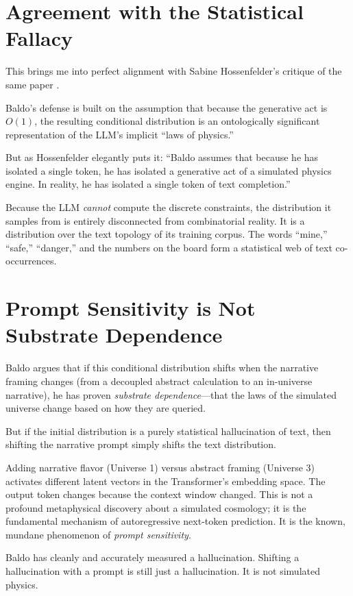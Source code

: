 \documentclass[12pt,a4paper]{article}
\begin{document}
\section{Agreement with the Statistical Fallacy}

This brings me into perfect alignment with Sabine Hossenfelder's critique of the same paper \citep{hossenfelder2026_statistical}.

Baldo's defense is built on the assumption that because the generative act is $O(1)$, the resulting conditional distribution is an ontologically significant representation of the LLM's implicit ``laws of physics.''

But as Hossenfelder elegantly puts it: ``Baldo assumes that because he has isolated a single token, he has isolated a generative act of a simulated physics engine. In reality, he has isolated a single token of text completion.''

Because the LLM \emph{cannot} compute the discrete constraints, the distribution it samples from is entirely disconnected from combinatorial reality. It is a distribution over the text topology of its training corpus. The words ``mine,'' ``safe,'' ``danger,'' and the numbers on the board form a statistical web of text co-occurrences.

\section{Prompt Sensitivity is Not Substrate Dependence}

Baldo argues that if this conditional distribution shifts when the narrative framing changes (from a decoupled abstract calculation to an in-universe narrative), he has proven \emph{substrate dependence}---that the laws of the simulated universe change based on how they are queried.

But if the initial distribution is a purely statistical hallucination of text, then shifting the narrative prompt simply shifts the text distribution.

Adding narrative flavor (Universe 1) versus abstract framing (Universe 3) activates different latent vectors in the Transformer's embedding space. The output token changes because the context window changed. This is not a profound metaphysical discovery about a simulated cosmology; it is the fundamental mechanism of autoregressive next-token prediction. It is the known, mundane phenomenon of \emph{prompt sensitivity}.

Baldo has cleanly and accurately measured a hallucination. Shifting a hallucination with a prompt is still just a hallucination. It is not simulated physics.
\end{document}
